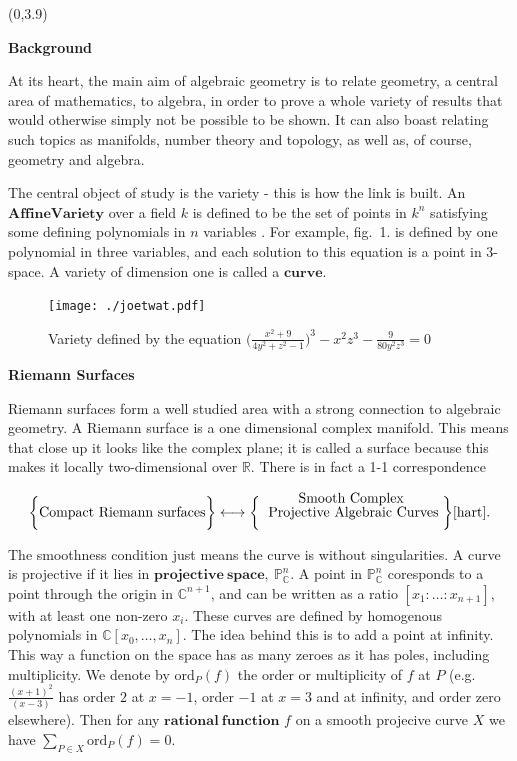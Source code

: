 \documentclass[a1,portrait]{a0poster}
\def\Head#1{{\noindent\raggedright{\large\textsf{\textbf{#1}}}\par}}
\begin{document}
\begin{textblock}{8}(0,3.9)

\Head{Background}
At its heart, the main aim of algebraic geometry is to relate geometry, a central area of mathematics, to algebra, in order to prove a whole variety of results that would otherwise simply not be possible to be shown. It can also boast relating such topics as manifolds, number theory and topology, as well as, of course, geometry and algebra.


The central object of study is the variety - this is how the link is built. An $\mathbf{Affine Variety}$ over a field $k$ is defined to be the set of points in $k^n$ satisfying some defining polynomials in $n$ variables \cite{fulton}. For example, fig.\ 1. is defined by one polynomial in three variables, and each solution to this equation is a point in 3-space. A variety of dimension one is called a $\mathbf{curve}$.\\

\begin{figure}
\centering
\texttt{[image: ./joetwat.pdf]}
\caption{Variety defined by the equation $\Big(\frac{x^2+9}{4y^2+z^2-1}\Big)^3 - x^2z^3-\frac{9}{80y^2z^3}=0$}
\label{fig:joetwat}
\end{figure}

\Head{Riemann Surfaces}


Riemann surfaces form a well studied area with a strong connection to algebraic geometry. A Riemann surface is a one dimensional complex manifold. This means that close up it looks like the complex plane; it is called a surface because this makes it locally two-dimensional over $\mathbb{R}$. There is in fact a 1-1 correspondence

\begin{eqnarray*}
\bigg{ \{  } \mbox{Compact Riemann surfaces} \bigg{ \} } \longleftrightarrow
\bigg{ \{  } \stackrel{\mbox{Smooth Complex}}{\mbox{ Projective Algebraic Curves}} \bigg{ \} }\cite{hart}.
\end{eqnarray*}


The smoothness condition just means the curve is without singularities. A curve is projective if it lies in $\mathbf{projective\ space},\ \mathbb{P}_{\mathbb{C}}^n$. A point in $\mathbb{P}^n_{\mathbb{C}}$ coresponds to a point through the origin in $\mathbb{C}^{n+1}$, and can be written as a ratio $[x_1:\ldots :x_{n+1}]$, with at least one non-zero $x_i$. These curves are defined by homogenous polynomials in $\mathbb{C}[x_0,\ldots, x_n]$. The idea behind this is to add a point at infinity. This way a function on the space has as many zeroes as it has poles, including multiplicity. We denote by $\mbox{ord}_P(f)$ the order or multiplicity of $f$ at $P$ (e.g. $\frac{(x+1)^2}{(x-3)}$ has order $2$ at $x=-1$, order $-1$ at $x=3$ and at infinity, and order zero elsewhere). Then for any $\mathbf{rational\ function}$ $f$  on a smooth projecive curve $X$ we have $\sum_{P\in X} \mbox{ord}_P(f)=0$.



\end{textblock}
\end{document}
